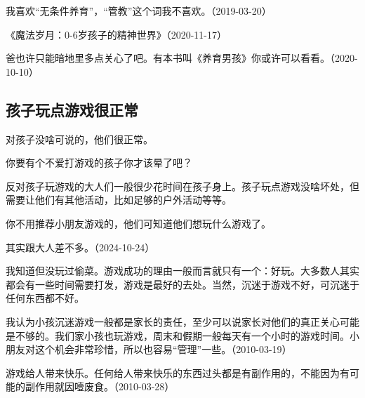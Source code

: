 
我喜欢“无条件养育”，“管教”这个词我不喜欢。（2019-03-20）


《魔法岁月：0-6岁孩子的精神世界》（2020-11-17）


爸也许只能暗地里多点关心了吧。有本书叫《养育男孩》你或许可以看看。（2020-10-10）

\subsection{孩子玩点游戏很正常}


对孩子没啥可说的，他们很正常。

你要有个不爱打游戏的孩子你才该晕了吧？

反对孩子玩游戏的大人们一般很少花时间在孩子身上。孩子玩点游戏没啥坏处，但需要让他们有其他活动，比如足够的户外活动等等。


你不用推荐小朋友游戏的，他们可知道他们想玩什么游戏了。


其实跟大人差不多。（2024-10-24）


我知道但没玩过偷菜。游戏成功的理由一般而言就只有一个：好玩。大多数人其实都会有一些时间需要打发，游戏是最好的去处。当然，沉迷于游戏不好，可沉迷于任何东西都不好。

我认为小孩沉迷游戏一般都是家长的责任，至少可以说家长对他们的真正关心可能是不够的。我们家小孩也玩游戏，周末和假期一般每天有一个小时的游戏时间。小朋友对这个机会非常珍惜，所以也容易“管理”一些。（2010-03-19）


游戏给人带来快乐。任何给人带来快乐的东西过头都是有副作用的，不能因为有可能的副作用就因噎废食。（2010-03-28）

